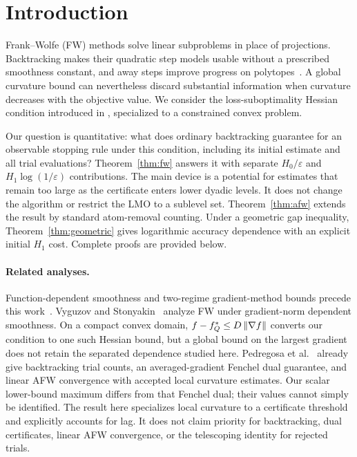 \section{Introduction}
Frank--Wolfe (FW) methods solve linear subproblems in place of
projections. Backtracking makes their quadratic step models usable
without a prescribed smoothness constant, and away steps improve
progress on polytopes~\cite{braun,pedregosa,lacostejaggi}.
A global curvature bound can nevertheless discard substantial
information when curvature decreases with the objective value.
We consider the loss-suboptimality Hessian condition introduced in
\cite{warmup}, specialized to a constrained convex problem.

Our question is quantitative: what does ordinary backtracking guarantee
for an observable stopping rule under this condition, including its
initial estimate and all trial evaluations? Theorem~\ref{thm:fw}
answers it with separate $H_0/\varepsilon$ and $H_1\log(1/\varepsilon)$
contributions. The main device is a potential for estimates that remain
too large as the certificate enters lower dyadic levels. It does not
change the algorithm or restrict the LMO to a sublevel set.
Theorem~\ref{thm:afw} extends the result by standard atom-removal
counting. Under a geometric gap inequality,
Theorem~\ref{thm:geometric} gives logarithmic accuracy dependence with
an explicit initial $H_1$ cost. Complete proofs are provided below.

\paragraph{Related analyses.}
Function-dependent smoothness and two-regime gradient-method bounds
precede this work~\cite{warmup,lobanovkoloskova,lobanov}.
Vyguzov and Stonyakin~\cite{vyguzov} analyze FW under gradient-norm
dependent smoothness. On a compact convex domain,
$f-f_Q^*\le D\left\|\nabla f\right\|$ converts our condition to one such Hessian
bound, but a global bound on the largest gradient does not retain the
separated dependence studied here.
Pedregosa et al.~\cite[Theorems 1, 3, and 4]{pedregosa} already give
backtracking trial counts, an averaged-gradient Fenchel dual guarantee,
and linear AFW convergence with accepted local curvature estimates.
Our scalar lower-bound maximum differs from that Fenchel dual; their
values cannot simply be identified. The result here specializes local
curvature to a certificate threshold and explicitly accounts for lag.
It does not claim priority for backtracking, dual certificates, linear
AFW convergence, or the telescoping identity for rejected trials.

